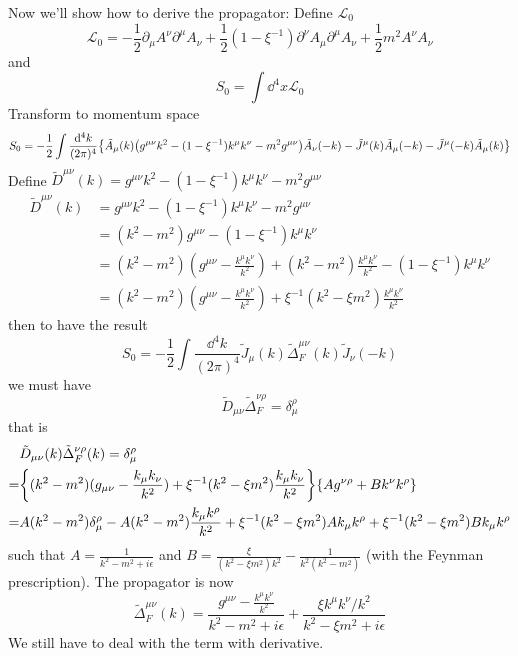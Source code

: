 \documentclass{article}
\newcommand{\lag}{\mathcal{L}}
\newcommand{\sm}{^{\mu}}
\newcommand{\sn}{^{\nu}}
\newcommand{\smn}{^{\mu\nu}}
\begin{document}
\begin{enumerate}[\bf 1.]
  Now we'll show how to derive the propagator: Define $\lag_0$
  $$\lag_0=-\frac{1}{2}\partial_{\mu}A^{\nu}\partial^{\mu}A_{\nu}+\frac{1}{2}(1-\xi^{-1})\partial^{\nu}A_{\mu}\partial^{\mu}A_{\nu}+\frac{1}{2}m^2A^{\nu}A_{\nu}$$
  and $$S_0=\int \dd^4x \lag_0$$
  Transform to momentum space
  $$S_0=-\frac{1}{2}\int\frac{\dd^4 k}{(2\pi)^4}\Bqty{\tilde A_{\mu}(k)\pqty{g^{\mu\nu}k^2-(1-\xi^{-1})k^{\mu}k^{\nu}-m^2g^{\mu\nu}}\tilde A_{\nu}(-k)-\tilde J^{\mu}(k)\tilde A_{\mu}(-k)-\tilde J^{\mu}(-k)\tilde A_{\mu}(k)}$$
  Define $\tilde D^{\mu\nu}(k)=g^{\mu\nu}k^2-(1-\xi^{-1})k^{\mu}k^{\nu}-m^2g^{\mu\nu}$
  \begin{align*}
    \tilde D^{\mu\nu}(k)&=g^{\mu\nu}k^2-(1-\xi^{-1})k^{\mu}k^{\nu}-m^2g^{\mu\nu}\\
    &=(k^2-m^2)g^{\mu\nu}-(1-\xi^{-1})k^{\mu}k^{\nu}\\
    &=(k^2-m^2)(g^{\mu\nu}-\frac{k^{\mu}k^{\nu}}{k^2})+(k^2-m^2)\frac{k^{\mu}k^{\nu}}{k^2}-(1-\xi^{-1})k\sm k\sn\\
    &=(k^2-m^2)(g^{\mu\nu}-\frac{k^{\mu}k^{\nu}}{k^2})+\xi^{-1}(k^2-\xi m^2)\frac{k\sm k\sn}{k^2}
  \end{align*}
  then to have the result
  $$S_0=-\frac{1}{2}\int\frac{\dd^4k}{(2\pi)^4}\tilde J_{\mu}(k)\tilde \Delta_F^{\mu\nu}(k)\tilde J_{\nu}(-k)$$
  we must have
  $$\tilde D_{\mu\nu}\tilde \Delta_F^{\nu\rho}=\delta_{\mu}^{\rho}$$
  that is
  \begin{align*}
    &\tilde D_{\mu\nu}(k)\tilde \Delta_F^{\nu\rho}(k)=\delta_{\mu}^{\rho}\\
    =&\Bqty{(k^2-m^2)(g_{\mu\nu}-\frac{k_{\mu}k_{\nu}}{k^2})+\xi^{-1}(k^2-\xi m^2)\frac{k_{\mu} k_{\nu}}{k^2}}\Bqty{Ag^{\nu\rho}+Bk^{\nu}k^{\rho}}\\
    =&A(k^2-m^2)\delta^{\rho}_{\mu}-A(k^2-m^2)\frac{k_{\mu}k^{\rho}}{k^2}+\xi^{-1}(k^2-\xi m^2)Ak_{\mu}k^{\rho}+\xi^{-1}(k^2-\xi m^2)Bk_{\mu}k^{\rho}
  \end{align*}
  such that $A=\frac{1}{k^2-m^2+i\epsilon}$ and $B=\frac{\xi}{(k^2-\xi m^2)k^2}-\frac{1}{k^2(k^2-m^2)}$ (with the Feynman prescription). The propagator is now
  $$\tilde \Delta_F^{\mu\nu}(k)=\frac{g\smn-\frac{k\sm k\sn}{k^2}}{k^2-m^2+i\epsilon}+\frac{\xi k\sm k\sn/k^2}{k^2-\xi m^2+i\epsilon}$$
  We still have to deal with the term with derivative.

\end{enumerate}
\end{document}
